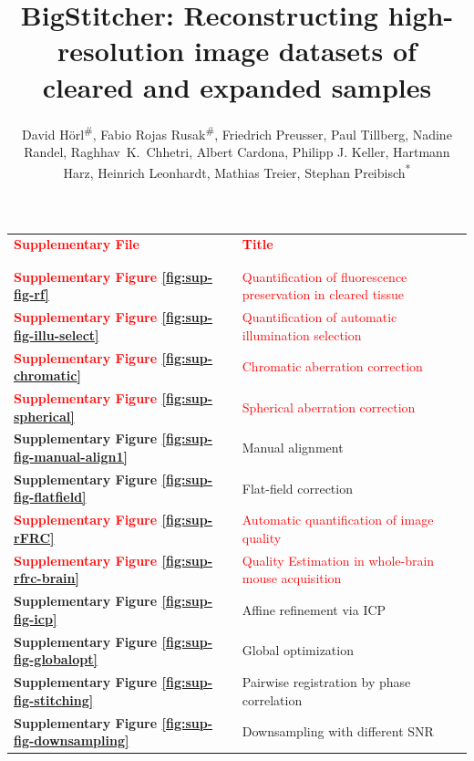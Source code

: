\documentclass[]{spie}  %
\title{BigStitcher: Reconstructing high-resolution image datasets of cleared and expanded samples}
\author{David H{\"o}rl\textsuperscript{\#}, Fabio Rojas Rusak\textsuperscript{\#}, Friedrich Preusser, Paul Tillberg, Nadine Randel, Raghhav~K.~Chhetri, Albert Cardona, Philipp J. Keller, Hartmann Harz, Heinrich Leonhardt, Mathias Treier, Stephan Preibisch\textsuperscript{*}
}
\def\red{\textcolor{red}}
\newcommand\tablespace{\vspace{2.5mm}}
\begin{document}
\maketitle

\setcounter{page}{1}


\hspace{5mm}

\begin{table}[h!]
\center
{
\fontsize{12pt}{11pt}\selectfont
\center
\begin{tabular}{lp{11cm}}
\textbf{\textcolor{red}{Supplementary File}} & \textbf{\textcolor{red}{Title}}\\ \\
\hline
\\
\textbf{\red{Supplementary Figure \ref{fig:sup-fig-rf}}} & \red{Quantification of fluorescence preservation in cleared tissue}\tablespace \\
\textbf{\red{Supplementary Figure \ref{fig:sup-fig-illu-select}}} & \red{Quantification of automatic illumination selection} \tablespace \\
\textbf{\red{Supplementary Figure \ref{fig:sup-chromatic}}} & \red{Chromatic aberration correction}\tablespace \\
\textbf{\red{Supplementary Figure \ref{fig:sup-spherical}}} & \red{Spherical aberration correction}\tablespace \\
\textbf{Supplementary Figure \ref{fig:sup-fig-manual-align1}} &  Manual alignment \tablespace \\
\textbf{Supplementary Figure \ref{fig:sup-fig-flatfield}} & Flat-field correction \tablespace \\
\textbf{\red{Supplementary Figure \ref{fig:sup-rFRC}}} & \red{Automatic quantification of image quality}\tablespace \\
\textbf{\red{Supplementary Figure \ref{fig:sup-rfrc-brain}}} & \red{Quality Estimation in whole-brain mouse acquisition}\tablespace \\
\textbf{Supplementary Figure \ref{fig:sup-fig-icp}} & Affine refinement via ICP \tablespace \\
\textbf{Supplementary Figure \ref{fig:sup-fig-globalopt}} & Global optimization \tablespace \\
\textbf{Supplementary Figure \ref{fig:sup-fig-stitching}} & Pairwise registration by phase correlation \tablespace \\
\textbf{Supplementary Figure \ref{fig:sup-fig-downsampling}} & Downsampling with different SNR \tablespace \\

\end{tabular}}
\end{table}
\end{document}
